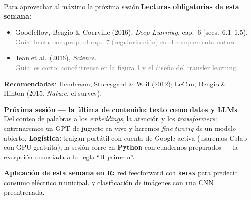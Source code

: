 \documentclass{beamer}
\newcommand{\1}{\mathbb{I}}
\begin{document}
\begin{frame}{Para aprovechar al máximo la próxima sesión}
\small
\textbf{Lecturas obligatorias de esta semana:}
\begin{itemize}\itemsep4pt
  \item Goodfellow, Bengio \& Courville (2016), \emph{Deep Learning}, cap.\ 6 (secs.\ 6.1--6.5). \\ \textcolor{gray}{Guía: hasta backprop; el cap.\ 7 (regularización) es el complemento natural.}
  \item Jean et al.\ (2016), \emph{Science}. \\ \textcolor{gray}{Guía: es corto; concéntrense en la figura 1 y el diseño del transfer learning.}
\end{itemize}

\textbf{Recomendadas:} Henderson, Storeygard \& Weil (2012); LeCun, Bengio \& Hinton (2015, \emph{Nature}, el survey).
\pause

\vspace{0.2cm}
\textbf{Próxima sesión --- la última de contenido:} \textbf{texto como datos y LLMs}. Del conteo de palabras a los \emph{embeddings}, la atención y los \emph{transformers}: entrenaremos un GPT de juguete en vivo y haremos \emph{fine-tuning} de un modelo abierto. \textbf{Logística:} traigan portátil con cuenta de Google activa (usaremos Colab con GPU gratuita); la sesión corre en \textbf{Python} con cuadernos preparados --- la excepción anunciada a la regla ``R primero''.
\pause

\vspace{0.2cm}
\textbf{Aplicación de esta semana en R:} red feedforward con \texttt{keras} para predecir consumo eléctrico municipal, y clasificación de imágenes con una CNN preentrenada.
\end{frame}
\end{document}

